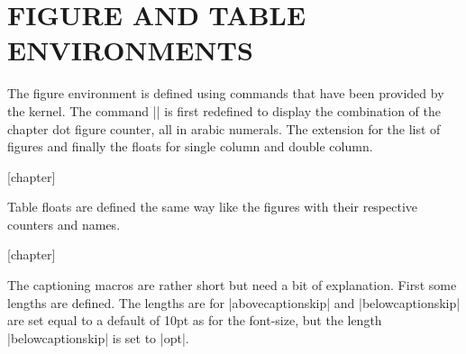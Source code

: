 \section*{FIGURE AND TABLE ENVIRONMENTS}

\begin{multicols}{2}
 The figure environment is defined using commands that have been provided by the kernel.  The command |\thefigure| is first redefined to display the combination of the chapter dot figure counter, all in arabic numerals. The extension for the list of figures and finally the floats for single column and double column.

\end{multicols}

\label{book:figure}
\begin{teX}
[chapter]
\renewcommand \thefigure
     {\ifnum \c@chapter>\z@ \thechapter.\fi \@arabic\c@figure}
\def\fps@figure{tbp}
\def\ftype@figure{1}
\def\ext@figure{lof}
\def\fnum@figure{\figurename\nobreakspace\thefigure}
\newenvironment{figure}
               {\@float{figure}}
               {\end@float}
\newenvironment{figure*}
               {\@dblfloat{figure}}
               {\end@dblfloat}
\end{teX}




\begin{multicols}{2}
 Table floats are defined the same way like the figures with their respective counters and names.  
\end{multicols}

\begin{teX}
[chapter]
\renewcommand \thetable
     {\ifnum \c@chapter>\z@ \thechapter.\fi \@arabic\c@table}
\def\fps@table{tbp}
\def\ftype@table{2}
\def\ext@table{lot}
\def\fnum@table{\tablename\nobreakspace\thetable}


\newenvironment{table}
               {\@float{table}}
               {\end@float}

\newenvironment{table*}
               {\@dblfloat{table}}
               {\end@dblfloat}
\end{teX}

\begin{multicols}{2}
The captioning macros are rather short but need a bit of explanation. First
some lengths are defined. The lengths are for |abovecaptionskip| and |belowcaptionskip| are set equal to a default of 10pt as for the font-size, but the length |belowcaptionskip| is set to |opt|.
\end{multicols}

